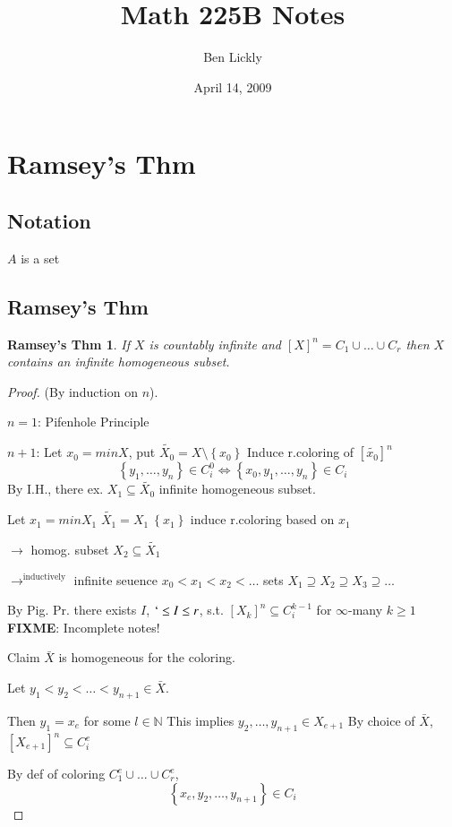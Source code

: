 \documentclass[12pt]{article}
\author{Ben Lickly}
\date{April 14, 2009}
\title{Math 225B Notes}
\newcommand{\Nat}{\ensuremath{\mathbb{N}}}
\newcommand{\fixme}{\\ \textbf{FIXME}: Incomplete notes!}
\begin{document}
\maketitle

\section{Ramsey's Thm}
\subsection{Notation}
$A$ is a set

\subsection{Ramsey's Thm}
\newtheorem{ramsey}{Ramsey's Thm}
\begin{ramsey}
  If $X$ is countably infinite and $[X]^n = C_1 \cup \dots \cup C_r$
  then $X$ contains an infinite homogeneous subset.
\end{ramsey}
\begin{proof}
  (By induction on $n$).

  $n=1$: Pifenhole Principle

  $n+1$: Let $x_0 = min X$, put $\widetilde{X_0} = X \setminus \left\{ x_0 \right\}$
  Induce r.coloring of $[\widetilde{x_0}]^n$
  \[
  \left\{ y_1, \dots, y_n \right\} \in C^0_i \Leftrightarrow \left\{ x_0, y_1, \dots, y_n \right\} \in C_i
  \]
  By I.H., there ex. $X_1 \subseteq \widetilde{X_0}$ infinite homogeneous subset.

  Let $x_1 = min X_1$   $\widetilde{X_1} = X_1 \ \left\{ x_1 \right\}$
  induce r.coloring based on $x_1$

  $\rightarrow$ homog. subset $X_2 \subseteq \widetilde{X_1}$
  
  $\rightarrow^\text{inductively}$ infinite seuence $x_0 < x_1 < x_2 < \dots$
  sets $X_1 \supseteq X_2 \supseteq X_3 \supseteq \dots$

  By Pig. Pr. there exists $I$, $` \le I \le r$, s.t.
  $\left[ X_k \right]^n \subseteq C^{k-1}_i$ for $\infty$-many $k \ge 1$
  \fixme

  Claim $\bar{X}$ is homogeneous for the coloring.

  Let $y_1 < y_2 < \dots < y_{n+1} \in \bar{X}$.

  Then $y_1 = x_e$ for some $l \in \Nat$
  This implies $y_2 , \dots, y_{n+1} \in X_{e+1}$
  By choice of $\bar{X}$, $\left[ X_{e+1} \right]^n \subseteq C^e_i$

  By def of coloring $C^e_1 \cup \dots \cup C^e_r$, 
  \[
  \left\{ x_e, y_2, \dots, y_{n+1} \right\} \in C_i
  \]
\end{proof}
\end{document}
